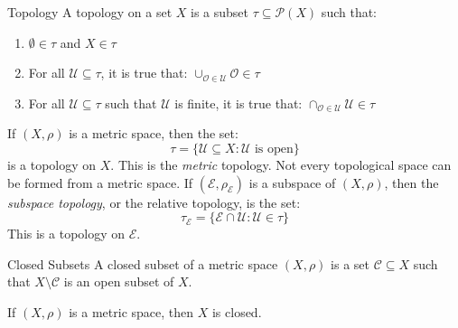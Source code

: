 \documentclass[crop=false,class=article,oneside]{standalone}
\begin{document}
            \begin{ldefinition}{Topology}
                A topology on a set $X$ is a subset
                $\tau\subseteq\mathcal{P}(X)$ such that:
                \begin{enumerate}
                    \item $\emptyset\in\tau$ and $X\in\tau$
                    \item For all $\mathcal{U}\subseteq\tau$, it is true that:
                          $\cup_{\mathcal{O}\in\mathcal{U}}\mathcal{O}\in\tau$
                    \item For all $\mathcal{U}\subseteq\tau$ such that
                          $\mathcal{U}$ is finite, it is true that:
                          $\cap_{\mathcal{O}\in\mathcal{U}}\mathcal{U}\in\tau$
                \end{enumerate}
            \end{ldefinition}
            \begin{lexample}
                If $(X,\rho)$ is a metric space, then the set:
                \begin{equation}
                    \tau=\{\mathcal{U}\subseteq{X}:
                        \mathcal{U}\textrm{ is open}\}
                \end{equation}
                is a topology on $X$. This is the \textit{metric} topology.
                Not every topological space can be formed from a metric space.
                If $(\mathcal{E},\rho_{\mathcal{E}})$ is a subspace of
                $(X,\rho)$, then the \textit{subspace topology}, or the
                relative topology, is the set:
                \begin{equation}
                    \tau_{\mathcal{E}}
                    =\{\mathcal{E}\cap\mathcal{U}:\mathcal{U}\in\tau\}
                \end{equation}
                This is a topology on $\mathcal{E}$.
            \end{lexample}
            \begin{ldefinition}{Closed Subsets}
                A closed subset of a metric space $(X,\rho)$ is a set
                $\mathcal{C}\subseteq{X}$ such that $X\setminus\mathcal{C}$
                is an open subset of $X$.
            \end{ldefinition}
            \begin{theorem}
                If $(X,\rho)$ is a metric space, then $X$ is closed.
            \end{theorem}
\end{document}
